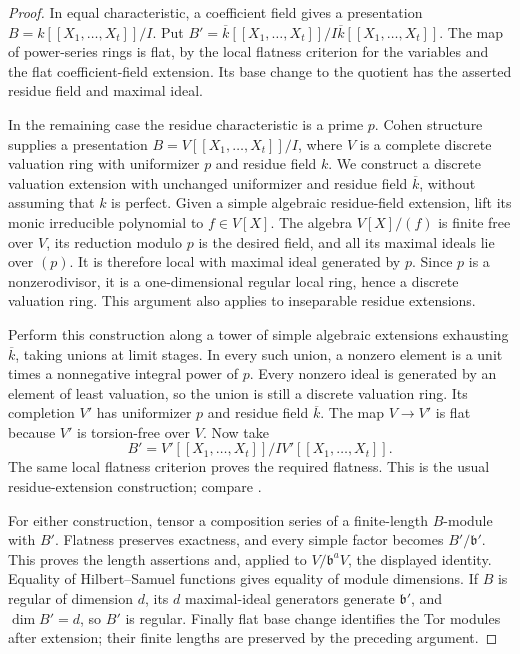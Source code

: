 \begin{proof}
In equal characteristic, a coefficient field gives a presentation
$B=k[[X_1,\ldots,X_t]]/I$.  Put
$B'=\overline{k}[[X_1,\ldots,X_t]]/I\overline{k}[[X_1,\ldots,X_t]]$.
The map of power-series rings is flat, by the local flatness criterion
for the variables and the flat coefficient-field extension.  Its base
change to the quotient has the asserted residue field and maximal ideal.

In the remaining case the residue characteristic is a prime $p$.
Cohen structure supplies a presentation $B=V[[X_1,\ldots,X_t]]/I$,
where $V$ is a complete discrete valuation ring with uniformizer $p$
and residue field $k$.  We construct a discrete valuation extension
with unchanged uniformizer and residue field $\overline{k}$, without
assuming that $k$ is perfect.  Given a simple algebraic residue-field
extension, lift its monic irreducible polynomial to $f\in V[X]$.
The algebra $V[X]/(f)$ is finite free over $V$, its reduction modulo $p$
is the desired field, and all its maximal ideals lie over $(p)$.
It is therefore local with maximal ideal generated by $p$.
Since $p$ is a nonzerodivisor, it is a one-dimensional regular local
ring, hence a discrete valuation ring.  This argument also applies
to inseparable residue extensions.

Perform this construction along a tower of simple algebraic extensions
exhausting $\overline{k}$, taking unions at limit stages.  In every such
union, a nonzero element is a unit times a nonnegative integral power
of $p$.  Every nonzero ideal is generated by an element of least
valuation, so the union is still a discrete valuation ring.  Its
completion $V'$ has uniformizer $p$ and residue field $\overline{k}$.
The map $V\to V'$ is flat because $V'$ is torsion-free over $V$.
Now take
\[
 B'=V'[[X_1,\ldots,X_t]]/IV'[[X_1,\ldots,X_t]].
\]
The same local flatness criterion proves the required flatness.
This is the usual residue-extension construction; compare
\cite[Lemma~2.2]{Ma}.

For either construction, tensor a composition series of a finite-length
$B$-module with $B'$.  Flatness preserves exactness, and every simple
factor becomes $B'/\mathfrak b'$.  This proves the length assertions
and, applied to $V/\mathfrak b^aV$, the displayed identity.  Equality of
Hilbert--Samuel functions gives equality of module dimensions.  If $B$
is regular of dimension $d$, its $d$ maximal-ideal generators generate
$\mathfrak b'$, and $\dim B'=d$, so $B'$ is regular.  Finally flat base
change identifies the Tor modules after extension; their finite
lengths are preserved by the preceding argument.
\end{proof}

